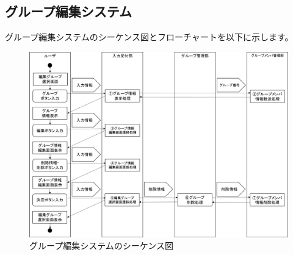 \newpage
\subsection{グループ編集システム}
グループ編集システムのシーケンス図とフローチャートを以下に示します。

\begin{figure}[htbp]
  \begin{center}
    \includegraphics[width=1\linewidth,clip]{./img/edit_group/main.png}
    \caption{グループ編集システムのシーケンス図}\label{fig:editgroupseaquence}
  \end{center}
\end{figure}

